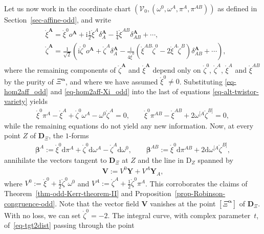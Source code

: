 \documentclass[10pt,a4paper]{amsart}
\numberwithin{equation}{section}
\newcommand{\mbf} [1]{\mathbf{#1}}
\newcommand{\mc} [1]{\mathcal{#1}}
\newcommand{\Drm} {{\mathrm{D}}}
\newcommand{\dd} {\mathrm{d}}
\newcommand{\ii} {\mathrm{i}}
\newcommand{\mr}[1] {\mathring{#1}}
\begin{document}
Let us now work in the coordinate chart $(\mc{V}_0 , ( \omega^0, \omega^A , \pi^A , \pi^{AB} )) $ as def\/ined in Section~\ref{sec-affine-odd}, and write
\begin{gather}\label{eq-hom2aff-Xi_odd}\begin{split}
&\mr{\xi}^{\mbf{A}} = \mr{\xi}^0 o^{\mbf{A}} + \ii \frac{1}{2} \mr{\xi}^A \delta_A^{\mbf{A}} - \frac{1}{4} \mr{\xi}^{AB} \delta_{AB}^{\mbf{A}} + \cdots , \\
&\mr{\zeta}^{\mbf{A}} = \frac{1}{\sqrt{2}} \left( \ii \mr{\zeta}^0 o^{\mbf{A}} + \mr{\zeta}^A \delta_A^{\mbf{A}} - \frac{\ii}{4 \mr{\xi}^0} \left( \mr{\xi}^{AB} \mr{\zeta}^0 - 2 \mr{\xi}^A \mr{\zeta}^B \right) \delta_{AB}^{\mbf{A}} + \cdots \right) ,
\end{split}
\end{gather}
where the remaining components of $\mr{\zeta}^{\mbf{A}}$ and $\mr{\xi}^{\mbf{A}}$ depend only on $\mr{\zeta}^0$, $\mr{\zeta}^A$, $\mr{\xi}^A$ and $\mr{\xi}^{AB}$ by the purity of $\Xi^{{\bm{\upalpha}}}$, and where we have assumed $\mr{\xi}^0 \neq 0$.
Substituting \eqref{eq-hom2aff_odd} and \eqref{eq-hom2aff-Xi_odd} into the last of equations \eqref{eq-alt-twistor-variety} yields
\begin{gather*}
\mr{\xi}^0 \pi^{A} - \mr{\xi}^{A} + \mr{\zeta}^0 \omega^{A} - \omega^0 \mr{\zeta}^{A} = 0 , \qquad
\mr{\xi}^0 \pi^{AB} - \mr{\xi}^{AB} + 2 \omega^{[A} \mr{\zeta}^{B]} = 0 ,
\end{gather*}
while the remaining equations do not yield any new information. Now, at every point $Z$ of $\mbf{D}_\Xi$, the $1$-forms
\begin{gather*}
\bm{\beta}^{A} := \mr{\xi}^0 \dd \pi^A + \mr{\zeta}^0 \dd \omega^A - \mr{\zeta}^A \dd \omega^0 , \qquad
\bm{\beta}^{AB} := \mr{\xi}^0 \dd \pi^{AB} + 2 \dd \omega^{[A} \mr{\zeta}^{B]} ,
\end{gather*}
annihilate the vectors tangent to $\mbf{D}_\Xi$ at $Z$ and the line in $\Drm_Z$ spanned by
\begin{gather}\label{eq-tgt2dist}
\bm{V} := V^0 \bm{Y} + V^A \bm{Y}_A ,
\end{gather}
where $V^0 := \mr{\xi}^0 + \frac{1}{2} \mr{\zeta}^0 \omega^0$ and $V^A := \mr{\zeta}^A + \frac{1}{2} \mr{\zeta}^0 \pi^A$. This corroborates the claims of Theorem~\ref{thm-odd-Kerr-theorem-II} and Proposition~\ref{prop-Robinson-congruence-odd}. Note that the vector f\/ield $\bm{V}$ vanishes at the point $[\Xi^{\mbf{\upalpha}}]$ of $\mbf{D}_\Xi$. With no loss, we can set $\mr{\zeta}^0 = -2$. The integral curve, with complex parameter~$t$, of~\eqref{eq-tgt2dist} passing through the point
\end{document}
